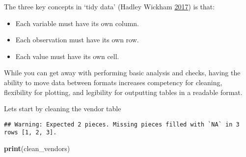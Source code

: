 \documentclass[
]{book}
\newenvironment{Shaded}{\begin{snugshade}}{\end{snugshade}}
\newcommand{\CommentTok}[1]{\textcolor[rgb]{0.56,0.35,0.01}{\textit{#1}}}
\newcommand{\DataTypeTok}[1]{\textcolor[rgb]{0.13,0.29,0.53}{#1}}
\newcommand{\KeywordTok}[1]{\textcolor[rgb]{0.13,0.29,0.53}{\textbf{#1}}}
\newcommand{\NormalTok}[1]{#1}
\newcommand{\OperatorTok}[1]{\textcolor[rgb]{0.81,0.36,0.00}{\textbf{#1}}}
\newcommand{\StringTok}[1]{\textcolor[rgb]{0.31,0.60,0.02}{#1}}
\providecommand{\tightlist}{%
  \setlength{\itemsep}{0pt}\setlength{\parskip}{0pt}}
\begin{document}
The three key concepts in `tidy data' (Hadley Wickham \protect\hyperlink{ref-rfordatasci}{2017}) is that:

\begin{itemize}
\tightlist
\item
  Each variable must have its own column.
\item
  Each observation must have its own row.
\item
  Each value must have its own cell.
\end{itemize}

While you can get away with performing basic analysis and checks, having the ability to move data between formats increases competency for cleaning, flexibility for plotting, and legibility for outputting tables in a readable format.

Lets start by cleaning the vendor table

\begin{Shaded}
\end{Shaded}

\begin{verbatim}
## Warning: Expected 2 pieces. Missing pieces filled with `NA` in 3 rows [1, 2, 3].
\end{verbatim}

\begin{Shaded}
\begin{Highlighting}[]
\KeywordTok{print}\NormalTok{(clean_vendors)}
\end{Highlighting}
\end{Shaded}
\end{document}
